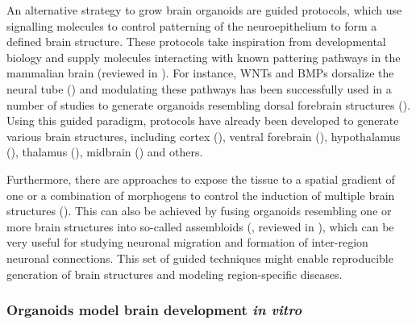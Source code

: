 An alternative strategy to grow brain organoids are guided protocols, which use signalling molecules to control patterning of the neuroepithelium to form a defined brain structure. These protocols take inspiration from  developmental biology and supply molecules interacting with known pattering pathways in the mammalian brain (reviewed in \cite{chiaradia_brain_2020}). For instance, WNTs and BMPs dorsalize the neural tube (\cite{dickinson_dorsalization_1995,saint-jeannet_regulation_1997}) and modulating these pathways has been successfully used in a number of studies to generate organoids resembling dorsal forebrain structures (\cite{xiang_fusion_2017,pasca_functional_2015,qian_brain-region-specific_2016,qian_sliced_2020}). Using this guided paradigm, protocols have already been developed to generate various brain structures, including cortex (\cite{eiraku_self-organizing_2011,kadoshima_self-organization_2013,pasca_functional_2015,velasco_individual_2019}), ventral forebrain (\cite{miura_generation_2020,birey_assembly_2017,xiang_fusion_2017,bagley_fused_2017}), hypothalamus (\cite{qian_brain-region-specific_2016}), thalamus (\cite{xiang_hesc-derived_2019}), midbrain (\cite{qian_brain-region-specific_2016,monzel_derivation_2017,kim_modeling_2019}) and others. 

Furthermore, there are approaches to expose the tissue to a spatial gradient of one or a combination of morphogens to control the induction of multiple brain structures (\cite{rifes_modeling_2020,cederquist_specification_2019}). This can also be achieved by fusing organoids resembling one or more brain structures into so-called assembloids (\cite{bagley_fused_2017,birey_assembly_2017,xiang_fusion_2017}, reviewed in \cite{pasca_rise_2018}), which can be very useful for studying neuronal migration and formation of inter-region neuronal connections. This set of guided techniques might enable reproducible generation of brain structures and modeling region-specific diseases.



\subsubsection{Organoids model brain development \textit{in vitro}}

